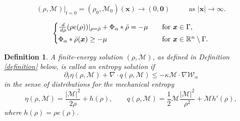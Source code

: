 \documentclass[10pt,a4paper]{amsart}
\newtheorem{definition}{Definition}
\def\M{{\mathcal{M}}}
\newcommand{\R}{\mathbb{R}}
\def\dd{{\, \rm d}}
\begin{document}
\begin{equation}\label{1.1-2}
(\rho, \M)|_{t=0}=(\rho_0, \M_0)( \boldsymbol{x})\longrightarrow (0, \boldsymbol{0})
\qquad\,\,\,\,\mbox{as $| \boldsymbol{x}|\to \infty$}.
\end{equation}

\begin{align}\label{station}
\begin{cases}
\frac{\dd}{\dd \rho}(\rho e(\rho))|_{\rho=\bar{\rho}}+\Phi_\alpha\ast\bar{\rho}= - \mu 
\quad & \mbox{for $\boldsymbol{x}\in \Gamma$},\\[1mm]
\Phi_\alpha\ast\bar{\rho}( \boldsymbol{x})\geq - \mu 
& \mbox{for $\boldsymbol{x}\in \R^n\setminus\Gamma$}.
\end{cases}
\end{align}

\begin{definition}\label{globalweak}
    A finite-energy solution $(\rho,\mathcal{M})$, as defined in Definition \ref{definition} below,
    is called an entropy solution if
    \[
 \partial_t \eta(\rho,\mathcal{M}) + \nabla \cdot q(\rho,\mathcal{M}) \leq -\kappa \mathcal{M}\cdot\nabla \mathcal{W}_\alpha
    \]
    in the sense of distributions for the mechanical entropy
    \[ \eta(\rho, \mathcal{M})
  = \frac{|\mathcal{M}|^{2}}{2\rho} + h(\rho),
  \qquad
  q(\rho,\mathcal{M})
  =\frac12 \mathcal{M}\frac{|\mathcal{M}|^{2}}{\rho^{2}}+\mathcal{M}h'(\rho),
\]
where $h(\rho) = \rho e(\rho)$.
\end{definition}
\end{document}
